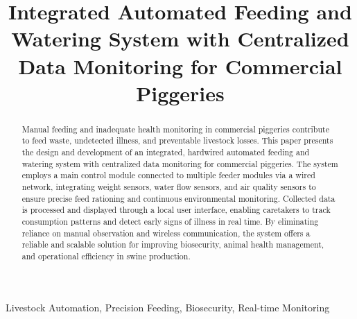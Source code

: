 \documentclass[conference]{IEEEtran}
\begin{document}


\setcounter{page}{1}

\title{Integrated Automated Feeding and Watering System with Centralized Data Monitoring for Commercial Piggeries}

\author{

}

\maketitle
\thispagestyle{plain}
\pagestyle{plain}
\begin{abstract}
  Manual feeding and inadequate health monitoring in commercial piggeries contribute to feed waste, undetected illness, and preventable livestock losses. This paper presents the design and development of an integrated, hardwired automated feeding and watering system with centralized data monitoring for commercial piggeries. The system employs a main control module connected to multiple feeder modules via a wired network, integrating weight sensors, water flow sensors, and air quality sensors to ensure precise feed rationing and continuous environmental monitoring. Collected data is processed and displayed through a local user interface, enabling caretakers to track consumption patterns and detect early signs of illness in real time. By eliminating reliance on manual observation and wireless communication, the system offers a reliable and scalable solution for improving biosecurity, animal health management, and operational efficiency in swine production.
\end{abstract}
\begin{IEEEkeywords}
  Livestock Automation, Precision Feeding, Biosecurity, Real-time Monitoring
\end{IEEEkeywords}
\end{document}
